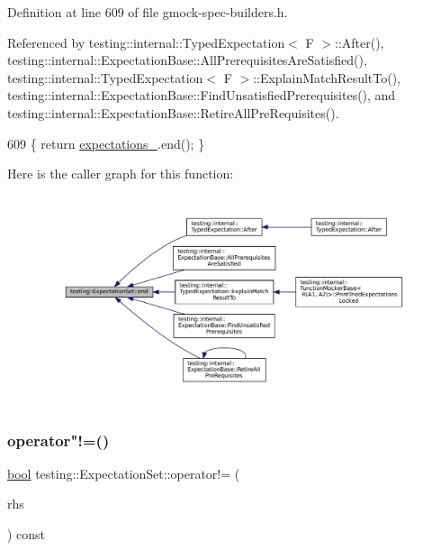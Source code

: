 Definition at line 609 of file gmock-\/spec-\/builders.\+h.



Referenced by testing\+::internal\+::\+Typed\+Expectation$<$ F $>$\+::\+After(), testing\+::internal\+::\+Expectation\+Base\+::\+All\+Prerequisites\+Are\+Satisfied(), testing\+::internal\+::\+Typed\+Expectation$<$ F $>$\+::\+Explain\+Match\+Result\+To(), testing\+::internal\+::\+Expectation\+Base\+::\+Find\+Unsatisfied\+Prerequisites(), and testing\+::internal\+::\+Expectation\+Base\+::\+Retire\+All\+Pre\+Requisites().


\begin{DoxyCode}
609 \{ \textcolor{keywordflow}{return} \hyperlink{classtesting_1_1ExpectationSet_a3f00dd7a10f85858b12d70f4cae568c2}{expectations\_}.end(); \}
\end{DoxyCode}
Here is the caller graph for this function\+:
\nopagebreak
\begin{figure}[H]
\begin{center}
\leavevmode
\includegraphics[width=350pt]{classtesting_1_1ExpectationSet_aac2a004529006c827e4d3420c4d4187a_icgraph}
\end{center}
\end{figure}
\mbox{\label{classtesting_1_1ExpectationSet_af7c2e68647817460c9e486cd446a9e3a}} 
\subsubsection{\texorpdfstring{operator"!=()}{operator!=()}}
{\footnotesize\ttfamily \hyperlink{classbool}{bool} testing\+::\+Expectation\+Set\+::operator!= (\begin{DoxyParamCaption}\item[{const \hyperlink{classtesting_1_1ExpectationSet}{Expectation\+Set} \&}]{rhs }\end{DoxyParamCaption}) const\hspace{0.3cm}{\ttfamily [inline]}}



